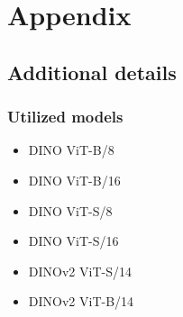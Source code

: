 
\chapter{Appendix}
\label{chap:appendix}




\section{Additional details}
\subsection{Utilized models}
\label{subsec:Utilized-models}
\begin{itemize}
    \item DINO ViT-B/8 \cite {caron2021emerging}
    \item DINO ViT-B/16 \cite {caron2021emerging}
    \item DINO ViT-S/8 \cite {caron2021emerging}
    \item DINO ViT-S/16 \cite {caron2021emerging}
    \item DINOv2 ViT-S/14
    \cite
    {oquab2023dinov2}
    \item DINOv2 ViT-B/14
    \cite
    {oquab2023dinov2}
    
\end{itemize}
